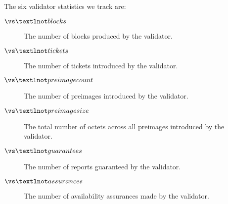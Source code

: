 The six validator statistics we track are:
\begin{description}
  \item[$\vs¬blocks$] The number of blocks produced by the validator.
  \item[$\vs¬tickets$] The number of tickets introduced by the validator.
  \item[$\vs¬preimagecount$] The number of preimages introduced by the validator.
  \item[$\vs¬preimagesize$] The total number of octets across all preimages introduced by the validator.
  \item[$\vs¬guarantees$] The number of reports guaranteed by the validator.
  \item[$\vs¬assurances$] The number of availability assurances made by the validator.
\end{description}


